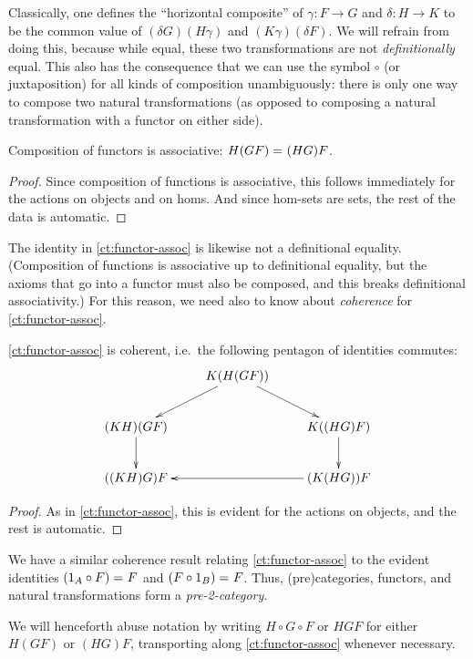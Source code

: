Classically, one defines the ``horizontal composite'' of $\gamma:F\to G$ and $\delta:H\to K$ to be the common value of ${(\delta G)(H\gamma)}$ and ${(K\gamma)(\delta F)}$.
We will refrain from doing this, because while equal, these two transformations are not \emph{definitionally} equal.
This also has the consequence that we can use the symbol $\circ$ (or juxtaposition) for all kinds of composition unambiguously: there is only one way to compose two natural transformations (as opposed to composing a natural transformation with a functor on either side).

\begin{lem}\label{ct:functor-assoc}
  Composition of functors is associative: $H(GF) =_{} (HG)F$.
\end{lem}
\begin{proof}
  Since composition of functions is associative, this follows immediately for the actions on objects and on homs.
  And since hom-sets are sets, the rest of the data is automatic.
\end{proof}

The identity in \autoref{ct:functor-assoc} is likewise not a definitional equality.
(Composition of functions is associative up to definitional equality, but the axioms that go into a functor must also be composed, and this breaks definitional associativity.)  For this reason, we need also to know about \emph{coherence} for \autoref{ct:functor-assoc}.

\begin{lem}\label{ct:pentagon}
  \autoref{ct:functor-assoc} is coherent, i.e.\ the following pentagon of identities commutes:
  \[ \xymatrix{ & K(H(GF)) \ar[dl] \ar[dr]\\
    (KH)(GF) \ar[d] && K((HG)F) \ar[d]\\
    ((KH)G)F && (K(HG))F \ar[ll] }
  \]
\end{lem}
\begin{proof}
  As in \autoref{ct:functor-assoc}, this is evident for the actions on objects, and the rest is automatic.
\end{proof}

We have a similar coherence result relating \autoref{ct:functor-assoc} to the evident identities $(1_A\circ F) =_{} F$ and $(F\circ 1_B) =_{} F$.
Thus, (pre)categories, functors, and natural transformations form a \emph{pre-2-category}.

We will henceforth abuse notation by writing $H\circ G\circ F$ or $HGF$ for either $H(GF)$ or $(HG)F$, transporting along \autoref{ct:functor-assoc} whenever necessary.



